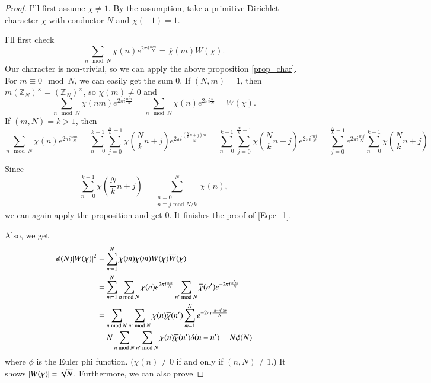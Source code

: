 \documentclass[a4paper, 12pt]{article}
\theoremstyle{Mydefinition}
\theoremstyle{Mytheorem}
\begin{document}
\begin{proof}


I'll first assume $\chi\neq 1$. By the assumption, take a primitive Dirichlet character $\chi$ with conductor $N$ and $\chi(-1) = 1$. 

I'll first check
\begin{equation}\label{Eq:c_1}
    \sum_{n \mod N}\chi(n)e^{2\pi i \frac{nm}{N}} = \overline{\chi}(m)W(\chi).
\end{equation}
Our character is non-trivial, so we can apply the above proposition \ref{prop_char}. For $m\equiv 0\mod N$, we can easily get the sum $0$. If $(N,m) = 1$, then $m\left(\mathbb{Z}_N\right)^\times = \left(\mathbb{Z}_N\right)^\times$, so $\chi(m)\neq 0$ and
\begin{equation*}
    \sum_{n \mod N}\chi(nm)e^{2\pi i \frac{nm}{N}} = \sum_{n \mod N}\chi(n)e^{2\pi i \frac{n}{N}} = W(\chi).
\end{equation*}
If $(m,N) = k>1$, then
\begin{equation*}
     \sum_{n \mod N}\chi(n)e^{2\pi i \frac{nm}{N}} = \sum_{n=0}^{k-1}\sum_{j=0}^{\frac{N}{k}-1}\chi(\frac{N}{k}n+j)e^{2\pi i \frac{(\frac{N}{k}n+j)m}{N}} = \sum_{n=0}^{k-1}\sum_{j=0}^{\frac{N}{k}-1}\chi(\frac{N}{k}n+j)e^{2\pi i \frac{mj}{N}} = \sum_{j=0}^{\frac{N}{k}-1}e^{2\pi i \frac{mj}{N}}\sum_{n=0}^{k-1}\chi(\frac{N}{k}n+j)
\end{equation*}

Since $$\sum_{n=0}^{k-1}\chi(\frac{N}{k}n+j) = \sum^N_{\substack{n=0 \\ n\equiv j \textrm{ mod } N/k}} \chi(n) ,$$ we can again apply the proposition and get $0$. It finishes the proof of \eqref{Eq:c_1}.

Also, we get
\begin{equation*}
\begin{split}
    \phi(N)\abs{W(\chi)}^2 &= \sum_{m=1}^{N} \chi(m)\overline{\chi}(m)W(\chi)\overline{W}(\chi)\\
    &=\sum_{m=1}^N \sum_{n \textrm{ mod } N}\chi(n)e^{2\pi i \frac{nm}{N}}\sum_{n' \textrm{ mod } N}\overline{\chi}(n')e^{-2\pi i \frac{n'm}{N}}\\
    &=\sum_{n \textrm{ mod } N}\sum_{n' \textrm{ mod } N}\chi(n)\overline{\chi}(n')\sum_{m=1}^N e^{-2\pi i \frac{(n-n')m}{N}}\\
    &=N\sum_{n \textrm{ mod } N}\sum_{n' \textrm{ mod } N}\chi(n)\overline{\chi}(n')\delta(n-n') = N\phi(N)
\end{split}
\end{equation*}
where $\phi$ is the Euler phi function. ($\chi(n)\neq 0$ if and only if $(n,N)\neq 1$.) It shows $\abs{W(\chi)} = \sqrt{N}$. Furthermore, we can also prove


\end{proof}
\end{document}
